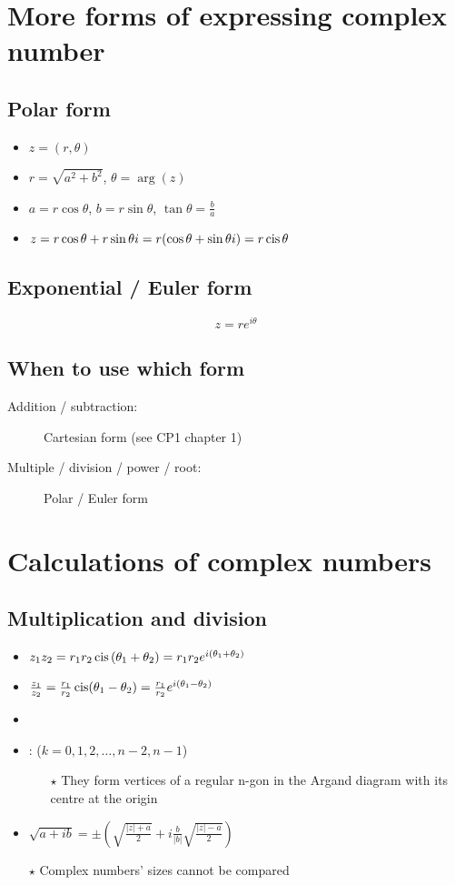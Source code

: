 \section{More forms of expressing complex number}
\subsection{Polar form}
\begin{itemize}
    \item $z=(r,\theta)$
    \item $r=\sqrt{a^2+b^2}$, $\theta = \arg(z)$
    \item $a=r\cos\theta$, $b=r\sin\theta$, $\tan\theta=\frac{b}{a}$
    \item $z=r\cos\theta+r\sin\theta i = r(\cos\theta+\sin\theta i)=r\operatorname{cis} \theta$
\end{itemize}
\subsection{Exponential / Euler form}
$$z=re^{i\theta}$$
\subsection{When to use which form}
\begin{description}
    \item[Addition / subtraction: ] Cartesian form (see CP1 chapter 1)
    \item[Multiple / division / power / root: ] Polar / Euler form
\end{description}

\section{Calculations of complex numbers}
\subsection{Multiplication and division}
\begin{itemize}
    \item $z_1z_2=r_1r_2\operatorname{cis}\left(\theta_1+\theta_2\right)=r_1r_2e^{i(\theta_1+\theta_2)}$
    \item $\frac{z_1}{z_2}=\frac{r_1}{r_2}\operatorname{cis}(\theta_1-\theta_2)=\frac{r_1}{r_2}e^{i(\theta_1-\theta_2)}$
    \item
    \item :  ($k=0,1,2,\dots,n-2,n-1$)
          \begin{itemize}
              \item[$\star$] They form vertices of a regular n-gon in the Argand diagram with its centre at the origin
          \end{itemize}
    \item $\sqrt{a+ib}=\pm\left(\sqrt{\frac{|z|+a}{2}}+i\frac{b}{|b|}\sqrt{\frac{|z|-a}{2}}\right)$

    \item[$\star$] Complex numbers' sizes cannot be compared
\end{itemize}

